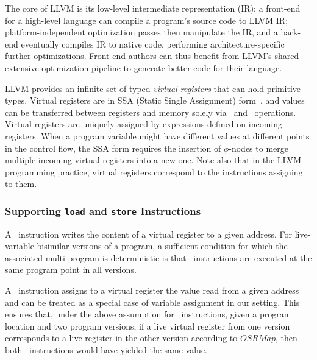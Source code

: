 The core of LLVM is its low-level intermediate representation (IR): a front-end for a high-level language can compile a program's source code to LLVM IR; platform-independent optimization passes then manipulate the IR, and a back-end eventually compiles IR to native code, performing architecture-specific further optimizations. Front-end authors can thus benefit from LLVM's shared extensive optimization pipeline to generate better code for their language.

LLVM provides an infinite set of typed {\em virtual registers} that can hold primitive types. Virtual registers are in SSA (Static Single Assignment) form~\cite{Cytron91}, and values can be transferred between registers and memory solely via \load\ and \store\ operations. Virtual registers are uniquely assigned by expressions defined on incoming registers. When a program variable might have different values at different points in the control flow, the SSA form requires the insertion of $\phi$-nodes to merge multiple incoming virtual registers into a new one. Note also that in the LLVM programming practice, virtual registers correspond to the instructions assigning to them.

\subsubsection*{Supporting \texttt{load} and \texttt{store} Instructions}
A \store\ instruction writes the content of a virtual register to a given address. For live-variable bisimilar versions of a program, a sufficient condition for which the associated multi-program is deterministic is that \store\ instructions are executed at the same program point in all versions.

A \load\ instruction assigns to a virtual register the value read from a given address and can be treated as a special case of variable assignment in our setting. This ensures that, under the above assumption for \store\ instructions, given a program location and two program versions, if a live virtual register from one version corresponds to a live register in the other version according to $OSRMap$, then both \load\ instructions would have yielded the same value.

